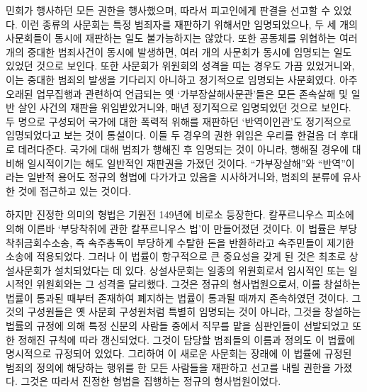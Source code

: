 민회가 행사하던 모든 권한을 행사했으며,
따라서 피고인에게 판결을 선고할 수 있었다.
이런 종류의 사문회는
특정 범죄자를 재판하기 위해서만 임명되었으나,
두 세 개의 사문회들이 동시에 재판하는 일도 불가능하지는 않았다.
또한
공동체를 위협하는 여러 개의 중대한 범죄사건이 동시에 발생하면,
여러 개의 사문회가 동시에 임명되는 일도 있었던 것으로 보인다.
또한 사문회가
위원회의 성격을 띠는 경우도 가끔 있었거니와,
이는 중대한 범죄의 발생을 기다리지 아니하고
정기적으로 임명되는 사문회였다.
아주 오래된 업무집행과 관련하여 언급되는
옛 `가부장살해사문관'들은
모든 존속살해 및 일반 살인 사건의
재판을
위임받았거니와,
매년 정기적으로 임명되었던 것으로 보인다.
두 명으로 구성되어
국가에 대한 폭력적 위해를 재판하던
`반역이인관'도
정기적으로 임명되었다고 보는 것이 통설이다.
이들 두 경우의 권한 위임은 우리를 한걸음 더 후대로 데려다준다.
국가에 대해 범죄가  행해진 후 임명되는 것이 아니라,
 행해질 경우에 대비해
일시적이기는 해도 일반적인 재판권을 가졌던 것이다.
``가부장살해''와
``반역''이라는 일반적 용어도
정규의 형법에 다가가고 있음을 시사하거니와,
범죄의 분류에 유사한 것에 접근하고 있는 것이다.

하지만 진정한 의미의 형법은 기원전 149년에 비로소 등장한다.
칼푸르니우스 피소에 의해
이른바
`부당착취에 관한 칼푸르니우스 법'이
만들어졌던 것이다.
이 법률은 부당착취금회수소송,
즉 속주총독이 부당하게 수탈한 돈을 반환하라고 속주민들이 제기한
소송에 적용되었다.
그러나 이 법률이 항구적으로 큰 중요성을 갖게 된 것은
최초로 상설사문회가 설치되었다는 데 있다.
상설사문회는 일종의 위원회로서
임시적인 또는 일시적인 위원회와는 그 성격을 달리했다.
그것은 정규의 형사법원으로서,
이를 창설하는 법률이 통과된 때부터 존재하여
폐지하는 법률이 통과될 때까지 존속하였던 것이다.
그것의 구성원들은
옛 사문회 구성원처럼 특별히 임명되는 것이 아니라,
그것을 창설하는 법률의 규정에 의해
특정 신분의 사람들 중에서 직무를 맡을 심판인들이 선발되었고
또한 정해진 규칙에 따라 갱신되었다.
그것이 담당할 범죄들의 이름과 정의도
이 법률에
명시적으로 규정되어 있었다.
그리하여 이 새로운 사문회는
장래에
이 법률에 규정된 범죄의 정의에 해당하는 행위를 한
모든 사람들을 재판하고 선고를 내릴 권한을 가졌다.
그것은 따라서
진정한 형법을 집행하는
정규의 형사법원이었다.


